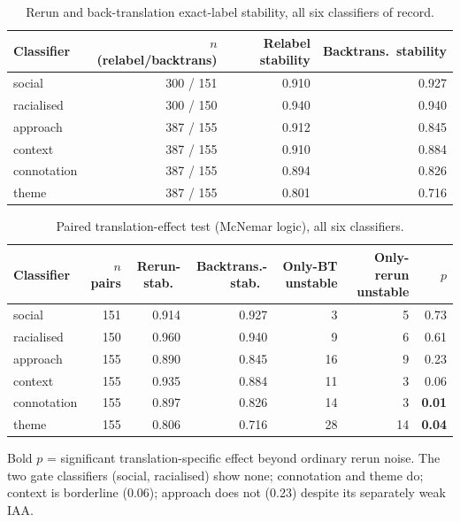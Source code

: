 
\begin{table}[htbp]
\centering
\footnotesize
\setlength{\tabcolsep}{4pt}
\caption{Rerun and back-translation exact-label stability, all six classifiers of record.}
\label{tab:robustness-stability}
\begin{tabular}{@{} l r r r @{}}
\toprule
Classifier & $n$ (relabel/backtrans) & Relabel stability & Backtrans.\ stability \\
\midrule
social & 300 / 151 & 0.910 & 0.927 \\
racialised & 300 / 150 & 0.940 & 0.940 \\
approach & 387 / 155 & 0.912 & 0.845 \\
context & 387 / 155 & 0.910 & 0.884 \\
connotation & 387 / 155 & 0.894 & 0.826 \\
theme & 387 / 155 & 0.801 & 0.716 \\
\bottomrule
\end{tabular}
\end{table}

\begin{table}[htbp]
\centering
\footnotesize
\setlength{\tabcolsep}{3pt}
\caption{Paired translation-effect test (McNemar logic), all six classifiers.}
\label{tab:robustness-mcnemar}
\begin{tabular}{@{} l r r r r r r @{}}
\toprule
Classifier & $n$ pairs & Rerun-stab.\ & Backtrans.-stab.\ & Only-BT unstable & Only-rerun unstable & $p$ \\
\midrule
social & 151 & 0.914 & 0.927 & 3 & 5 & 0.73 \\
racialised & 150 & 0.960 & 0.940 & 9 & 6 & 0.61 \\
approach & 155 & 0.890 & 0.845 & 16 & 9 & 0.23 \\
context & 155 & 0.935 & 0.884 & 11 & 3 & 0.06 \\
connotation & 155 & 0.897 & 0.826 & 14 & 3 & \textbf{0.01} \\
theme & 155 & 0.806 & 0.716 & 28 & 14 & \textbf{0.04} \\
\bottomrule
\end{tabular}

\vspace{2pt}
\raggedright\footnotesize
Bold $p$ = significant translation-specific effect beyond ordinary rerun noise. The two gate classifiers (social, racialised) show none; connotation and theme do; context is borderline (0.06); approach does not (0.23) despite its separately weak IAA.
\end{table}

